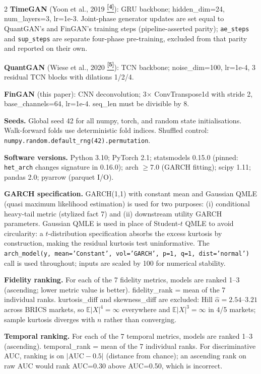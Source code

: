 \documentclass[10pt]{article}
\newcommand{\tcite}[1]{%
  \hyperlink{R:#1}{\textsuperscript{\scriptsize\textbf{[#1]}}}}
\newcommand{\E}{\mathbb{E}}
\begin{document}
\begin{multicols}{2}
\textbf{TimeGAN} (Yoon et al., 2019\tcite{4}): GRU backbone; hidden\_dim=24, num\_layers=3, lr=1e-3. Joint-phase generator updates are set equal to QuantGAN's and FinGAN's training steps (pipeline-asserted parity); \texttt{ae\_steps} and \texttt{sup\_steps} are separate four-phase pre-training, excluded from that parity and reported on their own.

\textbf{QuantGAN} (Wiese et al., 2020\tcite{5}): TCN backbone; noise\_dim=100, lr=1e-4, 3 residual TCN blocks with dilations 1/2/4.

\textbf{FinGAN} (this paper): CNN deconvolution; 3$\times$ ConvTranspose1d with stride 2, base\_channels=64, lr=1e-4. seq\_len must be divisible by 8.

\columnbreak

\textbf{Seeds.}
Global seed 42 for all numpy, torch, and random state initialisations. Walk-forward folds use deterministic fold indices. Shuffled control: \texttt{numpy.random.default\_rng(42).permutation}.

\textbf{Software versions.}
Python 3.10; PyTorch 2.1; statsmodels 0.15.0 (pinned: \texttt{het\_arch} changes signature in 0.16.0); arch $\geq$7.0 (GARCH fitting); scipy 1.11; pandas 2.0; pyarrow (parquet I/O).

\textbf{GARCH specification.}
GARCH(1,1) with constant mean and Gaussian QMLE (quasi maximum likelihood estimation) is used for two purposes: (i) conditional heavy-tail metric (stylized fact 7) and (ii) downstream utility GARCH parameters. Gaussian QMLE is used in place of Student-$t$ QMLE to avoid circularity: a $t$-distribution specification absorbs the excess kurtosis by construction, making the residual kurtosis test uninformative. The \texttt{arch\_model(y, mean='Constant', vol='GARCH', p=1, q=1, dist='normal')} call is used throughout; inputs are scaled by 100 for numerical stability.

\textbf{Fidelity ranking.}
For each of the 7 fidelity metrics, models are ranked 1--3 (ascending; lower metric value is better). fidelity\_rank = mean of the 7 individual ranks. kurtosis\_diff and skewness\_diff are excluded: Hill $\hat{\alpha}=2.54$--$3.21$ across BRICS markets, so $\E|X|^4=\infty$ everywhere and $\E|X|^3=\infty$ in 4/5 markets; sample kurtosis diverges with $n$ rather than converging.

\textbf{Temporal ranking.}
For each of the 7 temporal metrics, models are ranked 1--3 (ascending). temporal\_rank = mean of the 7 individual ranks. For discriminative AUC, ranking is on $|\text{AUC} - 0.5|$ (distance from chance); an ascending rank on raw AUC would rank AUC=0.30 above AUC=0.50, which is incorrect.


\end{multicols}
\end{document}

